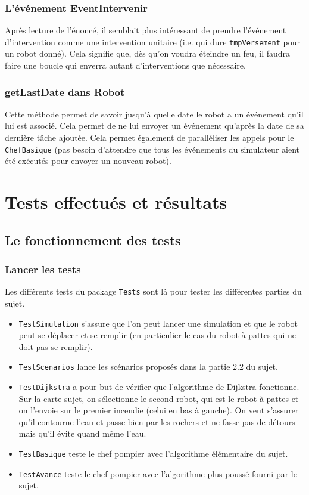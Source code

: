\documentclass[a4paper,8pt]{article} %
\begin{document}
\subsubsection{L'événement EventIntervenir}
Après lecture de l'énoncé, il semblait plus intéressant de prendre l'événement d'intervention comme une intervention unitaire
(i.e. qui dure \texttt{tmpVersement} pour un robot donné). Cela signifie que, dès qu'on voudra éteindre un feu, il faudra faire une 
boucle qui enverra autant d'interventions que nécessaire.
\subsubsection{getLastDate dans Robot}
Cette méthode permet de savoir jusqu'à quelle date le robot a un événement qu'il lui est associé. Cela permet de ne lui envoyer un événement
qu'après la date de sa dernière tâche ajoutée. Cela permet également de paralléliser les appels pour le \texttt{ChefBasique} 
(pas besoin d'attendre que tous les événements du simulateur aient été exécutés pour envoyer un nouveau robot).

\section{Tests effectués et résultats}
\subsection{Le fonctionnement des tests}
\subsubsection{Lancer les tests}
Les différents tests du package \texttt{Tests} sont là pour tester les différentes parties du sujet.
\begin{itemize}
    \item \texttt{TestSimulation} s'assure que l'on peut lancer une simulation et que le robot peut se déplacer et se remplir
    (en particulier le cas du robot à pattes qui ne doit pas se remplir).
    \item \texttt{TestScenarios} lance les scénarios proposés dans la partie 2.2 du sujet.
    \item \texttt{TestDijkstra} a pour but de vérifier que l'algorithme de Dijkstra fonctionne. Sur la carte sujet, 
    on sélectionne le second robot, qui est le robot à pattes et on l'envoie sur le premier incendie (celui en bas à gauche).
    On veut s'assurer qu'il contourne l'eau et passe bien par les rochers et ne fasse pas de détours mais qu'il évite quand même l'eau.
    \item \texttt{TestBasique} teste le chef pompier avec l'algorithme élémentaire du sujet.
    \item \texttt{TestAvance} teste le chef pompier avec l'algorithme plus poussé fourni par le sujet.
\end{itemize}
\end{document}
